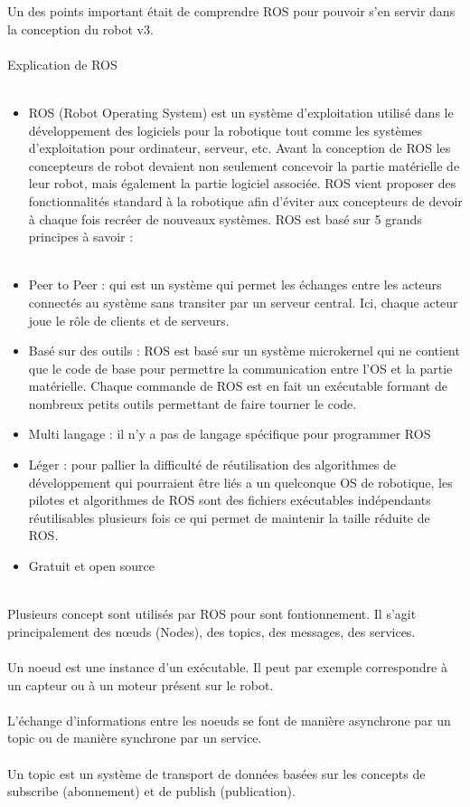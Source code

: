 \documentclass{PackagerQualityN}
\begin{document}
Un des points important était de comprendre ROS pour pouvoir s'en servir dans la conception du robot v3.\\
\\
Explication de ROS\\
\\
\begin{itemize}
    \item 
ROS (Robot Operating System) est un système d’exploitation utilisé dans le développement des logiciels pour la robotique tout comme les systèmes d’exploitation pour ordinateur, serveur, etc.
Avant la conception de ROS les concepteurs de robot devaient non seulement concevoir la partie matérielle de leur robot, mais également la partie logiciel associée. ROS vient proposer des fonctionnalités standard à la robotique afin d’éviter aux concepteurs de devoir à chaque fois recréer de nouveaux systèmes. ROS est basé sur 5 grands principes à savoir : \\
\\
\item 	Peer to Peer : qui est un système qui permet les échanges entre les acteurs connectés au système sans transiter par un serveur central. Ici, chaque acteur joue le rôle de clients et de serveurs.\\
\item 	Basé sur des outils : ROS est basé sur un système microkernel qui ne contient que le code de base pour permettre la communication entre l’OS et la partie matérielle. Chaque commande de ROS est en fait un exécutable formant de nombreux petits outils permettant de faire tourner le code.\\
\item 	Multi langage : il n’y a pas de langage spécifique pour programmer ROS\\
\item 	Léger : pour pallier la difficulté de réutilisation des algorithmes de développement qui pourraient être liés a un quelconque OS de robotique, les pilotes et algorithmes de ROS sont des fichiers exécutables indépendants réutilisables plusieurs fois ce qui permet de maintenir la taille réduite de ROS.\\
\item 	Gratuit et open source\\
\end{itemize}
\\
Plusieurs concept sont utilisés par ROS pour sont fontionnement. Il s'agit principalement des nœuds (Nodes), des topics, des messages, des services. \\
\\
  Un noeud est une instance d'un exécutable. Il peut par exemple correspondre à un capteur ou à un moteur présent sur le robot.\\
\\
L'échange d'informations entre les noeuds se font de manière asynchrone par un topic ou de manière synchrone par un service.\\
\\
Un topic est un système de transport de données basées sur les concepts de subscribe (abonnement) et de publish (publication).
\end{document}
